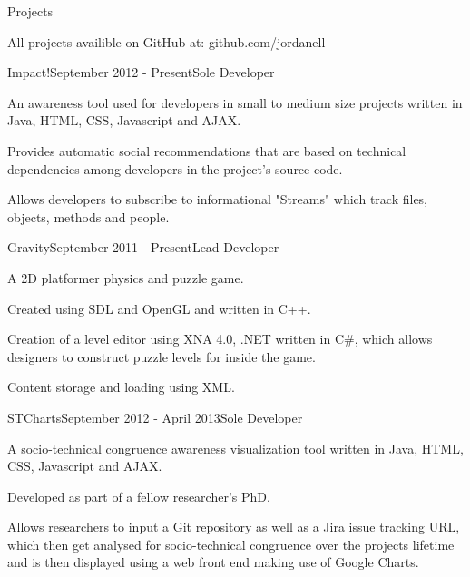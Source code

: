 \documentclass{resume} %
\begin{document}

\begin{rSection}{Projects}

All projects availible on GitHub at: github.com/jordanell

\begin{rSubsection}{Impact!}{September 2012 - Present}{Sole Developer}{}
\item An awareness tool used for developers in small to medium size projects written in Java, HTML, CSS, Javascript and AJAX.
\item Provides automatic social recommendations that are based on technical dependencies among developers in the project's source code.
\item Allows developers to subscribe to informational "Streams" which track files, objects, methods and people.
\end{rSubsection}

\begin{rSubsection}{Gravity}{September 2011 - Present}{Lead Developer}{}
\item A 2D platformer physics and puzzle game.
\item Created using SDL and OpenGL and written in C++. 
\item Creation of a level editor using XNA 4.0, .NET written in C\#, which allows designers to construct puzzle levels for inside the game.
\item Content storage and loading using XML.
\end{rSubsection}

\begin{rSubsection}{STCharts}{September 2012 - April 2013}{Sole Developer}{}
\item A socio-technical congruence awareness visualization tool written in Java, HTML, CSS, Javascript and AJAX.
\item Developed as part of a fellow researcher's PhD.
\item Allows researchers to input a Git repository as well as a Jira issue tracking URL, which then get analysed for socio-technical congruence over the projects lifetime and is then
displayed using a web front end making use of Google Charts.
\end{rSubsection}

\end{rSection}
\end{document}
